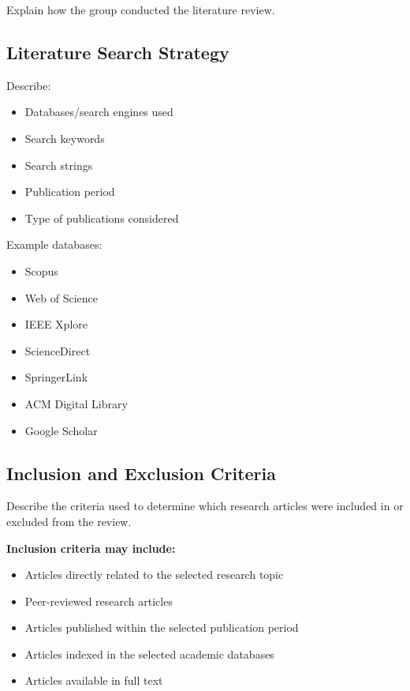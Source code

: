 \documentclass[12pt,a4paper]{article}
\begin{document}
\begin{justify}
Explain how the group conducted the literature review.


\subsection{Literature Search Strategy}

Describe:

\begin{itemize}
    \item Databases/search engines used
    \item Search keywords
    \item Search strings
    \item Publication period
    \item Type of publications considered\newline
\end{itemize}


Example databases:

\begin{itemize}
    \item Scopus
    \item Web of Science
    \item IEEE Xplore
    \item ScienceDirect
    \item SpringerLink
    \item ACM Digital Library
    \item Google Scholar
\end{itemize}


\subsection{Inclusion and Exclusion Criteria}

Describe the criteria used to determine which research articles were included in or excluded from the review.

\textbf{Inclusion criteria may include:}

\begin{itemize}
    \item Articles directly related to the selected research topic
    \item Peer-reviewed research articles
    \item Articles published within the selected publication period
    \item Articles indexed in the selected academic databases
    \item Articles available in full text
\end{itemize}


\end{justify}
\end{document}
